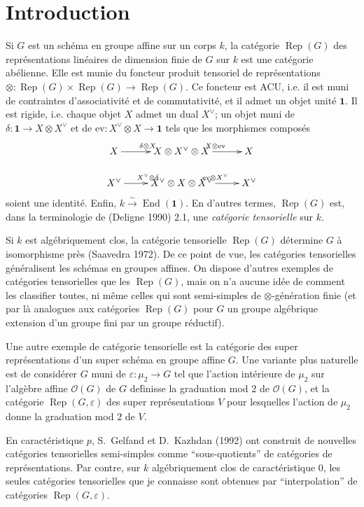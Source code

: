 \documentclass[11pt,a4paper]{article}
\theoremstyle{plain}
\theoremstyle{definition}
\DeclareMathOperator{\End}{End}
\DeclareMathOperator{\Rep}{Rep}
\newcommand{\eps}{\varepsilon}
\newcommand{\isom}{\xrightarrow{\sim}}
\newcommand{\ev}{\mathrm{ev}}
\begin{document}
\section*{Introduction}

Si $G$ est un sch\'ema en groupe affine sur un corps $k$, la cat\'egorie $\Rep(G)$ des repr\'esentations lin\'eaires de dimension finie de $G$ sur $k$ est une cat\'egorie ab\'elienne. Elle est munie du foncteur produit tensoriel de repr\'esentations $\otimes : \Rep(G) \times \Rep(G) \to \Rep(G)$. Ce foncteur est ACU, i.e. il est muni de contraintes d'associativit\'e et de commutativit\'e, et il admet un objet unit\'e $\mathbf{1}$. Il est rigide, i.e. chaque objet $X$ admet un dual $X^\vee$; un objet muni de $\delta : \mathbf{1} \to X \otimes X^\vee$ et de $\ev : X^\vee \otimes X \to \mathbf{1}$ tels que les morphismes compos\'es
\[
\xymatrix@R=1.5pc{
X \ar[r]^{\delta \otimes X} & X \otimes X^\vee \otimes X \ar[r]^{X \otimes \ev} & X \\
X^\vee \ar[r]^{X^\vee \otimes \delta} & X^\vee \otimes X \otimes X^\vee \ar[r]^{\ev \otimes X^\vee} & X^\vee
}
\]
soient une identit\'e. Enfin, $k \isom \End(\mathbf{1})$. En d'autres termes, $\Rep(G)$ est, dans la terminologie de (Deligne 1990) 2.1, une \emph{cat\'egorie tensorielle} sur $k$.

Si $k$ est alg\'ebriquement clos, la cat\'egorie tensorielle $\Rep(G)$ d\'etermine $G$ \`a isomorphisme pr\`es (Saavedra 1972). De ce point de vue, les cat\'egories tensorielles g\'en\'eralisent les sch\'emas en groupes affines. On dispose d'autres exemples de cat\'egories tensorielles que les $\Rep(G)$, mais on n'a aucune id\'ee de comment les classifier toutes, ni m\^eme celles qui sont semi-simples de $\otimes$-g\'en\'eration finie (et par l\`a analogues aux cat\'egories $\Rep(G)$ pour $G$ un groupe alg\'ebrique extension d'un groupe fini par un groupe r\'eductif).

Une autre exemple de cat\'egorie tensorielle est la cat\'egorie des super repr\'esentations d'un super sch\'ema en groupe affine $G$. Une variante plus naturelle est de consid\'erer $G$ muni de $\eps : \mu_2 \to G$ tel que l'action int\'erieure de $\mu_2$ sur l'alg\`ebre affine $\mathcal{O}(G)$ de $G$ de\'finisse la graduation mod $2$ de $\mathcal{O}(G)$, et la cat\'egorie $\Rep(G, \eps)$ des super repr\'esentations $V$ pour lesquelles l'action de $\mu_2$ donne la graduation mod $2$ de $V$.

En caract\'eristique $p$, S.~Gelfand et D.~Kazhdan (1992) ont construit de nouvelles cat\'egories tensorielles semi-simples comme ``sous-quotients'' de cat\'egories de repr\'esentations. Par contre, sur $k$ alg\'ebriquement clos de caract\'eristique $0$, les seules cat\'egories tensorielles que je connaisse sont obtenues par ``interpolation'' de cat\'egories $\Rep(G, \eps)$.
\end{document}
